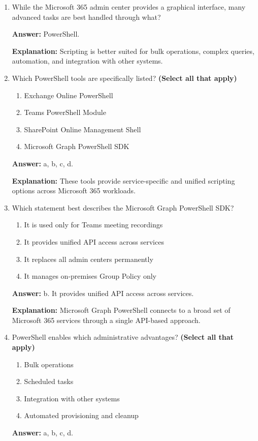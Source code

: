 \documentclass[10pt]{article}
\begin{document}
\begin{enumerate}[leftmargin=*]
\item While the Microsoft 365 admin center provides a graphical interface, many advanced tasks are best handled through what?

\textbf{Answer:} PowerShell.

\textbf{Explanation:} Scripting is better suited for bulk operations, complex queries, automation, and integration with other systems.

\item Which PowerShell tools are specifically listed? \textbf{(Select all that apply)}
\begin{enumerate}[label=\alph*., leftmargin=1.5em]
\item Exchange Online PowerShell
\item Teams PowerShell Module
\item SharePoint Online Management Shell
\item Microsoft Graph PowerShell SDK
\end{enumerate}
\textbf{Answer:} a, b, c, d.

\textbf{Explanation:} These tools provide service-specific and unified scripting options across Microsoft 365 workloads.

\item Which statement best describes the Microsoft Graph PowerShell SDK?
\begin{enumerate}[label=\alph*., leftmargin=1.5em]
\item It is used only for Teams meeting recordings
\item It provides unified API access across services
\item It replaces all admin centers permanently
\item It manages on-premises Group Policy only
\end{enumerate}
\textbf{Answer:} b. It provides unified API access across services.

\textbf{Explanation:} Microsoft Graph PowerShell connects to a broad set of Microsoft 365 services through a single API-based approach.

\item PowerShell enables which administrative advantages? \textbf{(Select all that apply)}
\begin{enumerate}[label=\alph*., leftmargin=1.5em]
\item Bulk operations
\item Scheduled tasks
\item Integration with other systems
\item Automated provisioning and cleanup
\end{enumerate}
\textbf{Answer:} a, b, c, d.


\end{enumerate}
\end{document}

